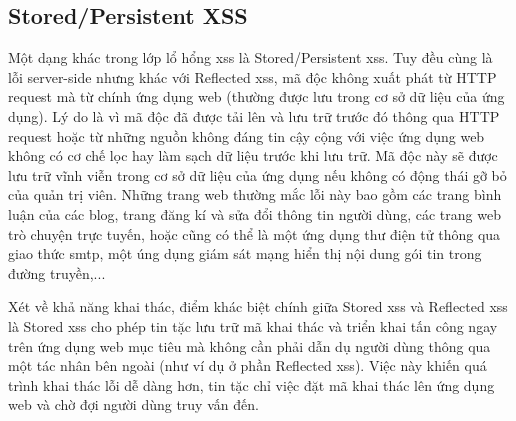\subsection{Stored/Persistent XSS}
Một dạng khác trong lớp lổ hổng \acrshort{xss} là Stored/Persistent \acrshort{xss}. Tuy đều cùng là lỗi server-side nhưng khác với Reflected \acrshort{xss}, mã độc không xuất phát từ HTTP request mà từ chính ứng dụng web (thường được lưu trong cơ sở dữ liệu của ứng dụng). Lý do là vì mã độc đã được tải lên và lưu trữ trước đó thông qua HTTP request hoặc từ những nguồn không đáng tin cậy cộng với việc ứng dụng web không có cơ chế lọc hay làm sạch dữ liệu trước khi lưu trữ. Mã độc này sẽ được lưu trữ vĩnh viễn trong cơ sở dữ liệu của ứng dụng nếu không có động thái gỡ bỏ của quản trị viên. Những trang web thường mắc lỗi này bao gồm các trang bình luận của các blog, trang đăng kí và sửa đổi thông tin người dùng, các trang web trò chuyện trực tuyến, hoặc cũng có thể là một ứng dụng thư điện tử thông qua giao thức \acrshort{smtp}, một úng dụng giám sát mạng hiển thị nội dung gói tin trong đường truyền,... \par
Xét về khả năng khai thác, điểm khác biệt chính giữa Stored \acrshort{xss} và Reflected \acrshort{xss} là Stored \acrshort{xss} cho phép tin tặc lưu trữ mã khai thác và triển khai tấn công ngay trên ứng dụng web mục tiêu mà không cần phải dẫn dụ người dùng thông qua một tác nhân bên ngoài (như ví dụ ở phần Reflected \acrshort{xss}). Việc này khiến quá trình khai thác lỗi dễ dàng hơn, tin tặc chỉ việc đặt mã khai thác lên ứng dụng web và chờ đợi người dùng truy vấn đến.

